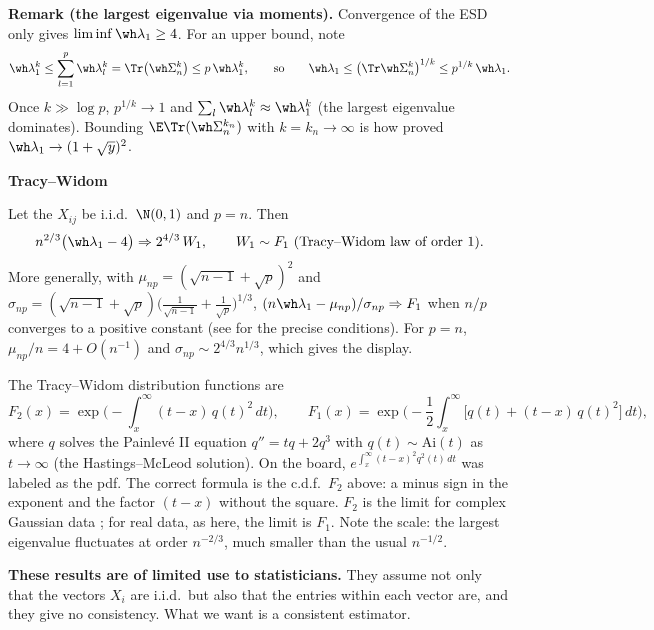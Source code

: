 \textbf{Remark (the largest eigenvalue via moments).} Convergence of the ESD only gives \(\liminf \wh\lambda_1 \ge 4\). For an upper bound, note
\[\wh\lambda_1^k \le \sum_{l=1}^p \wh\lambda_l^k = \Tr\big(\wh\Sigma_n^k\big) \le p\, \wh\lambda_1^k,
\qquad\text{so}\qquad
\wh\lambda_1 \le \big(\Tr \wh\Sigma_n^k\big)^{1/k} \le p^{1/k}\, \wh\lambda_1.\]
Once \(k \gg \log p\), \(p^{1/k} \to 1\) and \(\sum_l \wh\lambda_l^k \approx \wh\lambda_1^k\) (the largest eigenvalue dominates). Bounding \(\E \Tr(\wh\Sigma_n^{k_n})\) with \(k = k_n \to \infty\) is how \citet{Gem80} proved \(\wh\lambda_1 \to (1 + \sqrt y)^2\).

\textbf{Tracy--Widom}

\begin{theorem}\label{thm:tw}
Let the \(X_{ij}\) be i.i.d.\ \(\N(0,1)\) and \(p = n\). Then
\[n^{2/3}\big(\wh\lambda_1 - 4\big) \Rightarrow 2^{4/3}\, W_1, \qquad W_1 \sim F_1\ \text{(Tracy--Widom law of order 1)}.\]
More generally, with \(\mu_{np} = (\sqrt{n-1} + \sqrt p)^2\) and \(\sigma_{np} = (\sqrt{n-1} + \sqrt p)\big(\frac{1}{\sqrt{n-1}} + \frac{1}{\sqrt p}\big)^{1/3}\), \((n\wh\lambda_1 - \mu_{np})/\sigma_{np} \Rightarrow F_1\) when \(n/p\) converges to a positive constant (see \citet{Joh01} for the precise conditions). For \(p = n\), \(\mu_{np}/n = 4 + O(n^{-1})\) and \(\sigma_{np} \sim 2^{4/3} n^{1/3}\), which gives the display.
\end{theorem}

The Tracy--Widom distribution functions are \citep{TW94,TW96}
\[F_2(x) = \exp\Big(-\int_x^\infty (t - x)\, q(t)^2\, dt\Big), \qquad
F_1(x) = \exp\Big(-\frac{1}{2} \int_x^\infty \big[q(t) + (t - x)\, q(t)^2\big]\, dt\Big),\]
where \(q\) solves the Painlev\'e II equation \(q'' = tq + 2q^3\) with \(q(t) \sim \mathrm{Ai}(t)\) as \(t \to \infty\) (the Hastings--McLeod solution). On the board, \(e^{\int_x^\infty (t-x)^2 q^2(t)\, dt}\) was labeled as the pdf. The correct formula is the c.d.f.\ \(F_2\) above: a minus sign in the exponent and the factor \((t - x)\) without the square. \(F_2\) is the limit for complex Gaussian data \citep{Joh00}; for real data, as here, the limit is \(F_1\). Note the scale: the largest eigenvalue fluctuates at order \(n^{-2/3}\), much smaller than the usual \(n^{-1/2}\).

\textbf{These results are of limited use to statisticians.} They assume not only that the vectors \(X_i\) are i.i.d.\ but also that the entries within each vector are, and they give no consistency. What we want is a consistent estimator.

